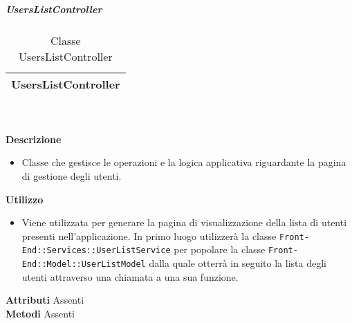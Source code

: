 			\subparagraph{UsersListController} 
\begin{table}[ht]
\begin{center}
\bgroup
	\setlength{\arrayrulewidth}{0.6mm}
	\def\arraystretch{1}
		\begin{tabular}{ | p{12cm} | }
				\hline  
					\centerline{\textbf{UsersListController}}
		\\ \hline 
				\hline
				\hline
		
		\end{tabular}
\egroup
\caption{Classe UsersListController}
\end{center}
\end{table} \textbf{\\ \\ Descrizione}
\begin{itemize}
\item[] Classe che gestisce le operazioni e la logica applicativa riguardante la pagina di gestione degli utenti.
\end{itemize} 
\textbf{Utilizzo}
\begin{itemize}
\item[] Viene utilizzata per generare la pagina di visualizzazione della lista di utenti presenti nell'applicazione. In primo luogo utilizzerà la classe \texttt{Front-End::Services::UserListService} per popolare la classe \texttt{Front-End::Model::UserListModel} dalla quale otterrà in seguito la lista degli utenti attraverso una chiamata a una sua funzione.
\end{itemize}
\textbf{Attributi}
Assenti \\
\textbf{Metodi}
Assenti \\

